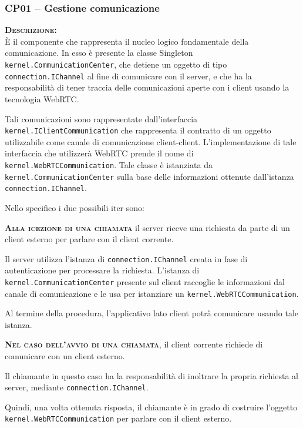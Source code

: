 \subsubsection{CP01 -- Gestione comunicazione}
\begin{description}
	\item{\scshape\bfseries Descrizione:}\\
È il componente che rappresenta il nucleo logico fondamentale della comunicazione. In esso è presente la classe Singleton \texttt{kernel.CommunicationCenter}, che detiene un oggetto di tipo \texttt{connection.IChannel} al fine di comunicare con il server, e che ha la responsabilità di tener traccia delle comunicazioni aperte con i client usando la tecnologia WebRTC\@.

Tali comunicazioni sono rappresentate dall'interfaccia \texttt{kernel.IClientCommunication} che rappresenta il contratto di un oggetto utilizzabile come canale di comunicazione client-client. L'implementazione di tale interfaccia che utilizzerà WebRTC prende il nome di \texttt{kernel.WebRTCCommunication}. Tale classe è istanziata da \texttt{kernel.CommunicationCenter} sulla base delle informazioni ottenute dall'istanza \texttt{connection.IChannel}. 

Nello specifico i due possibili iter sono:
\begin{description}
	\item{\bfseries\scshape Alla icezione di una chiamata} il server riceve una richiesta da parte di un client esterno per parlare con il client corrente.
	
Il server utilizza l'istanza di \texttt{connection.IChannel} creata in fase di autenticazione per processare la richiesta. L'istanza di \texttt{kernel.CommunicationCenter} presente sul client raccoglie le informazioni dal canale di comunicazione e le usa per istanziare un \texttt{kernel.WebRTCCommunication}.

Al termine della procedura, l'applicativo lato client potrà comunicare usando tale istanza.
	\item{\bfseries\scshape Nel caso dell'avvio di una chiamata}, il client corrente richiede di comunicare con un client esterno.
	
Il chiamante in questo caso ha la responsabilità di inoltrare la propria richiesta al server, mediante \texttt{connection.IChannel}.

Quindi, una volta ottenuta risposta, il chiamante è in grado di costruire l'oggetto \texttt{kernel.WebRTCCommunication} per parlare con il client esterno.
\end{description}


\end{description}

